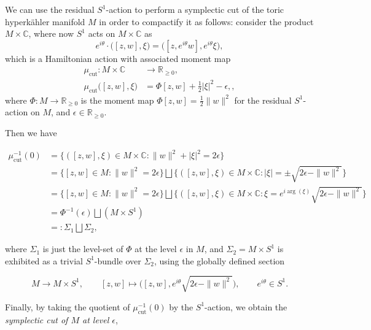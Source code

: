 \documentclass[11pt]{amsart}
\newcommand{\st}{\ensuremath{:}}%
\newcommand{\ra}{\rightarrow}
\newcommand{\m}{\mu}
\newcommand{\e}{\epsilon}
\newcommand{\HK}{hyperk\"ahler }
\newcommand{\RR}{\mathbb{R}}
\newcommand{\CC}{\mathbb{C}}
\begin{document}
We can use the residual $S^{1}$-action to perform a symplectic cut of the toric \HK manifold $M$ in order to compactify it as follows: consider the product $M \times \CC$, where now $S^{1}$ acts on $M \times \CC$ as
$$
e^{i\theta} \cdot \big( [z,w], \xi   \big) = \big( [z,e^{i\theta}w], e^{i\theta}\xi\big),
$$
which is a Hamiltonian action with associated moment map
\begin{equation*}
	\begin{split}
		\mu_{\text{cut}}: M \times \CC &\longrightarrow \RR_{\geq 0}, \\
		\mu_{\text{cut}}\big( [z,w], \xi  \big) &= \Phi[z,w] + \tfrac{1}{2}|\xi|^{2} - \e,,
	\end{split}
\end{equation*}
where $\Phi:M \ra \RR_{\geq 0}$ is the moment map $\Phi[z,w] = \tfrac{1}{2}\|w\|^{2}$ for the residual $S^{1}$-action on $M$, and $\e \in \RR_{\geq 0}$.

Then we have

\begin{equation*}
	\begin{split}
		\mu_{\text{cut}}^{-1}(0) &= \big\{ ([z,w],\xi) \in M \times \CC \st \|w\|^{2} + |\xi|^{2} = 2\e    \big\} \\
		&= \big\{ [z,w] \in M \st \|w\|^{2} = 2\e    \big\} \bigsqcup \big\{ ([z,w],\xi) \in M \times \CC \st |\xi| = \pm\sqrt{2\e - \|w\|^{2}} \big\} \\
		&= \big\{ [z,w] \in M \st \|w\|^{2} = 2\e    \big\} \bigsqcup \big\{ ([z,w],\xi) \in M \times \CC \st \xi = e^{i\arg(\xi)}\sqrt{2\e - \|w\|^{2}}    \big\} \\
		&= \Phi^{-1}(\e) \bigsqcup (M \times S^{1}) \\
		&=: \Sigma_{1} \bigsqcup \Sigma_{2},
	\end{split}
\end{equation*}

where $\Sigma_{1}$ is just the level-set of $\Phi$ at the level $\e$ in $M$, and $\Sigma_{2} = M \times S^{1}$ is exhibited as a trivial $S^{1}$-bundle over $\Sigma_{2}$, using the globally defined section

\begin{equation*}
	M \rightarrow M \times S^{1}, \qquad [z,w] \longmapsto \big( [z,w], e^{i\theta}\sqrt{2\e - \|w\|^{2}}\big), \qquad e^{i\theta} \in S^{1}.
\end{equation*}

Finally, by taking the quotient of $\m_{\text{cut}}^{-1}(0)$ by the $S^{1}$-action, we obtain the \emph{symplectic cut of $M$ at level $\epsilon$},
\end{document}
